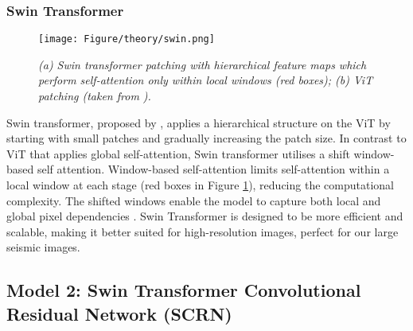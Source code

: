 \subsubsection{Swin Transformer}
\begin{figure}[h]
	\centering
	\texttt{[image: Figure/theory/swin.png]} %
	\caption{\textit{(a) Swin transformer patching with hierarchical feature maps which perform self-attention only within local windows (red boxes); (b) ViT patching (taken from \cite{liu2021swin}).}}
	\label{fig:swin}
\end{figure}
\noindent Swin transformer, proposed by , applies a hierarchical structure on the ViT by starting with small patches and gradually increasing the patch size. In contrast to ViT that applies global self-attention, Swin transformer utilises a shift window-based self attention. Window-based self-attention limits self-attention within a local window at each stage (red boxes in Figure \ref{fig:swin}), reducing the computational complexity. The shifted windows enable the model to capture both local and global pixel dependencies \cite{gao2024swin}. Swin Transformer is designed to be more efficient and scalable, making it better suited for high-resolution images, perfect for our large seismic images.

\subsection{Model 2: Swin Transformer Convolutional Residual Network (SCRN)}

